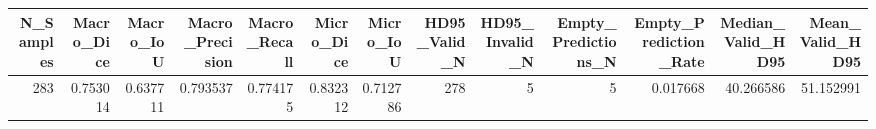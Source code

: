 \begin{tabular}{rrrrrrrrrrrrr}
\toprule
N_Samples & Macro_Dice & Macro_IoU & Macro_Precision & Macro_Recall & Micro_Dice & Micro_IoU & HD95_Valid_N & HD95_Invalid_N & Empty_Predictions_N & Empty_Prediction_Rate & Median_Valid_HD95 & Mean_Valid_HD95 \\
\midrule
283 & 0.753014 & 0.637711 & 0.793537 & 0.774175 & 0.832312 & 0.712786 & 278 & 5 & 5 & 0.017668 & 40.266586 & 51.152991 \\
\bottomrule
\end{tabular}

